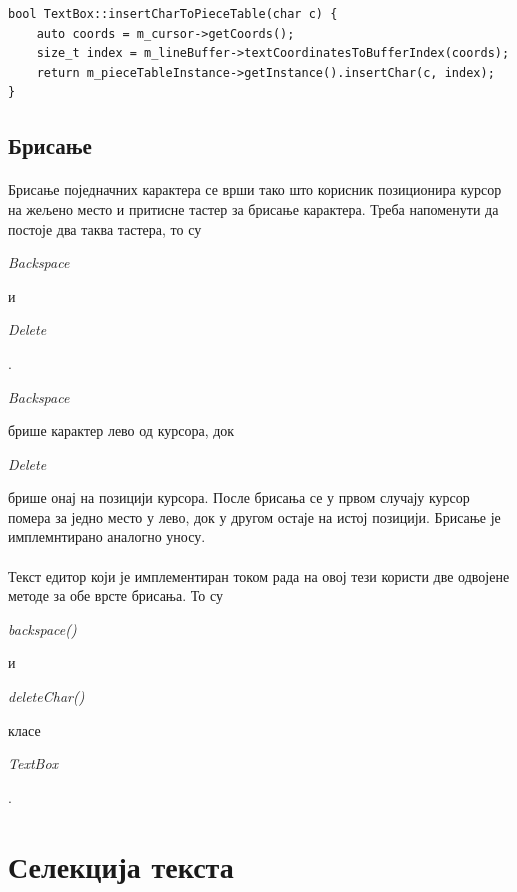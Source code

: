 \documentclass[12pt,oneside]{memoir}
\begin{document}
\begin{verbatim}
bool TextBox::insertCharToPieceTable(char c) {
	auto coords = m_cursor->getCoords();
	size_t index = m_lineBuffer->textCoordinatesToBufferIndex(coords);
	return m_pieceTableInstance->getInstance().insertChar(c, index);
}
\end{verbatim}


\subsection{Брисање}
\paragraph{}
Брисање поједначних карактера се врши тако што корисник позиционира курсор
на жељено место и притисне тастер за брисање карактера. Треба напоменути да 
постоје два таква тастера, то су \begin{latinica}\textit{Backspace}\end{latinica}
и \begin{latinica}\textit{Delete}\end{latinica}.
\begin{latinica}\textit{Backspace}\end{latinica} брише карактер лево од курсора,
док \begin{latinica}\textit{Delete}\end{latinica} брише онај на позицији курсора.
После брисања се у првом случају курсор помера за једно место у лево, док у другом
остаје на истој позицији. Брисање је имплемнтирано аналогно уносу.

\paragraph{}
Текст едитор који је имплементиран током рада на овој тези користи две одвојене
методе за обе врсте брисања. То су 
\begin{latinica}\textit{backspace()} \end{latinica} и
\begin{latinica}\textit{deleteChar()} \end{latinica} класе
\begin{latinica}\textit{TextBox} \end{latinica}.

\section{Селекција текста}
\end{document}
